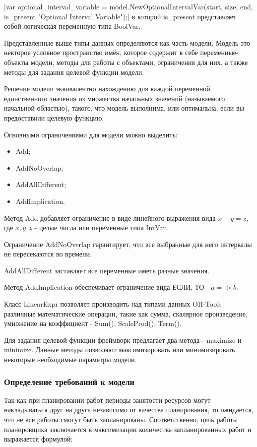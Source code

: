 |var optional_interval_variable = model.NewOptionalIntervalVar(start, size, end, is_present "Optional Interval Variable");|
в которой is\_present представляет собой логическая переменную типа BoolVar.

Представленные выше типы данных определяются как часть модели. Модель это некторое условное пространство имён, которое содержит в себе переменные-объекты модели, методы для работы с объектами, ограничения для них, а также методы для задания целевой функции модели.

Решение модели эквивалентно нахождению для каждой переменной единственного значения из множества начальных значений (называемого начальной областью), такого, что модель выполнима, или оптимальна, если вы предоставили целевую функцию.

Основными ограничениями для модели можно выделить:
\begin{itemize}
	\item Add; 
	\item AddNoOverlap;
	\item AddAllDifferent;
	\item AddImplication.
\end{itemize}

Метод Add добавляет ограничение в виде линейного выражения вида $x + y = z$, где $x, y, z$ - целые числа или переменные типа IntVar.

Ограничение AddNoOverlap гарантирует, что все выбранные для него интервалы не пересекаются во времени.

AddAllDifferent заставляет все переменные иметь разные значения.

Метод AddImplication обеспечивает ограничение вида ЕСЛИ, ТО - $a => b$.

Класс LinearExpr позволяет производить над типами данных OR-Tools различные математические операции, такие как сумма, скалярное произведение, умножение на коэффициент - Sum(), ScaleProd(), Term().

Для задания целевой функции фреймворк предлагает два метода - maximize и minimize. Данные методы позволяют максимизировать или минимизировать некоторые необходимые параметры модели.


\subsubsection{Определение требований к модели}

Так как при планировании работ периоды занятости ресурсов могут накладываться друг на друга независимо от качества планирования, то ожидается, что не все работы смогут быть запланированы. Соответственно, цель работы планировщика заключается в максимизации количества запланированных работ и выражается формулой:

